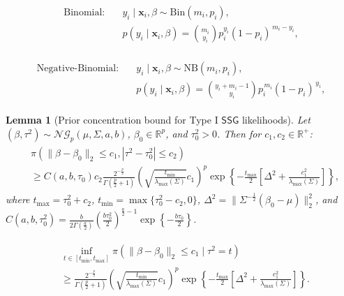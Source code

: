 \documentclass[10pt,a4paper]{amsart}
\newtheorem{lemma}{Lemma}
\begin{document}
\begin{align}\label{eq:param-binom}
    \begin{split}
        \text{Binomial}: \quad &y_i \mid \mathbf{x}_i, \beta \sim \mathrm{Bin}(m_i, p_i),\\
        & p(y_i\mid \mathbf{x}_i, \beta) = \binom{m_i}{y_i} p_i^{y_i} (1 - p_i)^{\,m_i - y_i},
    \end{split}
\end{align}

\begin{align}\label{eq:param-negbin}
    \begin{split}
        \text{Negative-Binomial}: \quad &y_i\mid \mathbf{x}_i, \beta \sim \mathrm{NB}(m_i, p_i),\\
        & p(y_i\mid \mathbf{x}_i, \beta) = \binom{y_i + m_i - 1}{y_i} p_i^{\,m_i} (1 - p_i)^{\,y_i},
    \end{split}
\end{align}

\begin{lemma}[Prior concentration bound for Type I $\mathsf{SSG}$ likelihoods]\label{lemma:prior-inequality}
Let $(\beta, \tau^2) \sim \mathcal{NG}_p(\mu, \Sigma, a, b)$, $\beta_0 \in \mathbb{R}^p$, and $\tau_0^2 > 0$. Then for $c_1, c_2 \in \mathbb{R}^{+}$:
\begin{align}\label{eq:lemma-anderson-normal-gamma}
\begin{split}
&\pi(\lVert\beta - \beta_0\rVert_2 \leq c_1, |\tau^2 - \tau_0^2| \leq c_2)\\
&\geq C(a,b,\tau_0)c_2
\frac{2^{-\frac{p}{2}}}{\Gamma\left(\frac{p}{2}+1\right)}\left(\sqrt{\frac{t_{\min}}{\lambda_{\mathrm{max}}(\Sigma)}}c_1\right)^{p}
\exp\left\{-\frac{t_{\max}}{2}\left[\Delta^2 + \frac{c_1^2}{\lambda_{\mathrm{max}}(\Sigma)}\right]\right\},
\end{split}
\end{align}
where $t_{\max} = \tau_0^2 + c_2$, $t_{\min} = \max\{\tau_0^2 - c_2, 0\}$, $\Delta^{2} = \lVert \Sigma^{-\frac{1}{2}}(\beta_0-\mu)\rVert_{2}^{2}$, and $C(a,b,\tau^2_0) = \frac{b}{2\Gamma\left(\frac{a}{2}\right)}\left(\frac{b \tau_0^2}{2}\right)^{\frac{a}{2}-1}\exp\left\{-\frac{b\tau_0}{2}\right\}$.
\end{lemma}

\begin{align}\label{eq:Ball-application-2}
    \begin{split}
        &\inf_{t \in [t_{\min}, t_{\max}]}\pi\left(\lVert \beta-\beta_0\rVert_2\leq c_1\mid \tau^2=t\right) \\
        &\geq \frac{2^{-\frac{p}{2}}}{\Gamma\left(\frac{p}{2}+1\right)}\left(\sqrt{\frac{t_{\min}}{\lambda_{\mathrm{max}}(\Sigma)}}c_1\right)^{p}\exp\left\{-\frac{t_{\max}}{2}\left[\Delta^2 + \frac{c_1^2}{\lambda_{\mathrm{max}}(\Sigma)}\right]\right\}.
    \end{split}
\end{align}
\end{document}
